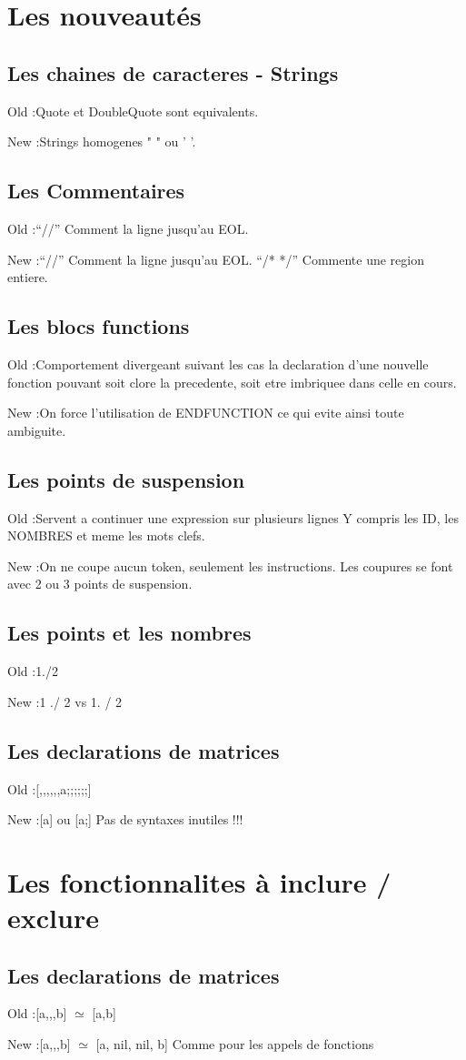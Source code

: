 \newcommand{\Old}[1]{\begin{description}\item{Old :}#1}
\newcommand{\New}[1]{\item{New :}#1\end{description}}

\section{Les nouveaut\'es}

\subsection{Les chaines de caracteres - Strings}
\Old{Quote et DoubleQuote sont equivalents.}
\New{Strings homogenes " " ou ' '.}

\subsection{Les Commentaires}
\Old{``//'' Comment la ligne jusqu'au EOL.}
\New{``//'' Comment la ligne jusqu'au EOL.
``/* */'' Commente une region entiere.}

\subsection{Les blocs functions}
\Old{Comportement divergeant suivant les cas
la declaration d'une nouvelle fonction pouvant
soit clore la precedente, soit etre imbriquee
dans celle en cours.}
\New{On force l'utilisation de ENDFUNCTION ce qui evite
ainsi toute ambiguite.}

\subsection{Les points de suspension}
\Old{Servent a continuer une expression sur plusieurs lignes
Y compris les ID, les NOMBRES et meme les mots clefs.}
\New{On ne coupe aucun token, seulement les instructions.
Les coupures se font avec 2 ou 3 points de suspension.}

\subsection{Les points et les nombres}
\Old{1./2}
\New{1 ./ 2 vs 1. / 2}

\subsection{Les declarations de matrices}
\Old{[,,,,,,a;;;;;;]}
\New{[a] ou [a;] Pas de syntaxes inutiles !!!}



\section{Les fonctionnalites \`a inclure / exclure}

\subsection{Les declarations de matrices}
\Old{[a,,,b] $\simeq$ [a,b]}
\New{[a,,,b] $\simeq$ [a, nil, nil, b] Comme pour les appels de fonctions}


